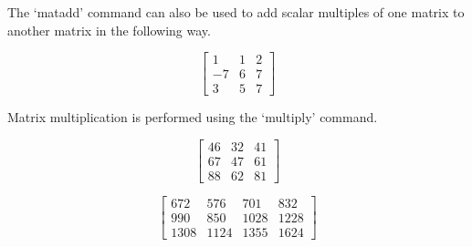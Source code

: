 The `matadd' command can also be used to add scalar multiples of
one matrix to another matrix in the following way.
\bigskip

\begin{maplegroup}
\begin{mapleinput}
\end{mapleinput}

\mapleresult
\begin{maplelatex}
\[
 \left[
{\begin{array}{rrr} 1 & 1 & 2 \\ -7 & 6 & 7 \\ 3 & 5 & 7
\end{array}}
 \right]
\]
\end{maplelatex}

\end{maplegroup}
\begin{maplegroup}
Matrix multiplication is performed using the `multiply' command.

\end{maplegroup}
\begin{maplegroup}
\begin{mapleinput}
\end{mapleinput}

\mapleresult
\begin{maplelatex}
\[
 \left[
{\begin{array}{rrr} 46 & 32 & 41 \\ 67 & 47 & 61 \\ 88 & 62 & 81
\end{array}}
 \right]
\]
\end{maplelatex}

\end{maplegroup}
\begin{maplegroup}
\begin{mapleinput}
\end{mapleinput}

\mapleresult
\begin{maplelatex}
\[
 \left[
{\begin{array}{rrrr} 672 & 576 & 701 & 832 \\ 990 & 850 & 1028 &
1228 \\ 1308 & 1124 & 1355 & 1624
\end{array}}
 \right]
\]
\end{maplelatex}

\end{maplegroup}
\bigskip

